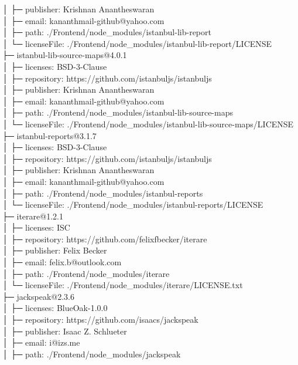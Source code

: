 │  ├─ publisher: Krishnan Anantheswaran\\
│  ├─ email: kananthmail-github@yahoo.com\\
│  ├─ path: ./Frontend/node\_modules/istanbul-lib-report\\
│  └─ licenseFile: ./Frontend/node\_modules/istanbul-lib-report/LICENSE\\
├─ istanbul-lib-source-maps@4.0.1\\
│  ├─ licenses: BSD-3-Clause\\
│  ├─ repository: https://github.com/istanbuljs/istanbuljs\\
│  ├─ publisher: Krishnan Anantheswaran\\
│  ├─ email: kananthmail-github@yahoo.com\\
│  ├─ path: ./Frontend/node\_modules/istanbul-lib-source-maps\\
│  └─ licenseFile: ./Frontend/node\_modules/istanbul-lib-source-maps/LICENSE\\
├─ istanbul-reports@3.1.7\\
│  ├─ licenses: BSD-3-Clause\\
│  ├─ repository: https://github.com/istanbuljs/istanbuljs\\
│  ├─ publisher: Krishnan Anantheswaran\\
│  ├─ email: kananthmail-github@yahoo.com\\
│  ├─ path: ./Frontend/node\_modules/istanbul-reports\\
│  └─ licenseFile: ./Frontend/node\_modules/istanbul-reports/LICENSE\\
├─ iterare@1.2.1\\
│  ├─ licenses: ISC\\
│  ├─ repository: https://github.com/felixfbecker/iterare\\
│  ├─ publisher: Felix Becker\\
│  ├─ email: felix.b@outlook.com\\
│  ├─ path: ./Frontend/node\_modules/iterare\\
│  └─ licenseFile: ./Frontend/node\_modules/iterare/LICENSE.txt\\
├─ jackspeak@2.3.6\\
│  ├─ licenses: BlueOak-1.0.0\\
│  ├─ repository: https://github.com/isaacs/jackspeak\\
│  ├─ publisher: Isaac Z. Schlueter\\
│  ├─ email: i@izs.me\\
│  ├─ path: ./Frontend/node\_modules/jackspeak\\
